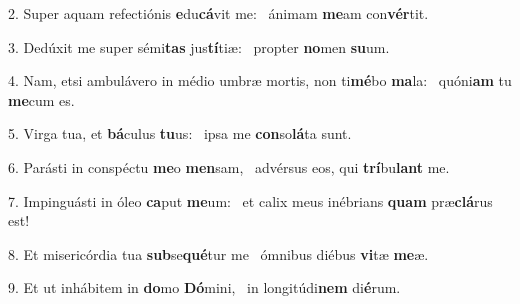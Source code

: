 2. Super aquam refectiónis \textbf{e}du\textbf{cá}vit me: \ast\  ánimam \textbf{me}am con\textbf{vér}tit.\

3. Dedúxit me super sémi\textbf{tas} jus\textbf{tí}tiæ: \ast\  propter \textbf{no}men \textbf{su}um.\

4. Nam, etsi ambulávero in médio umbræ mortis, non ti\textbf{mé}bo \textbf{ma}la: \ast\  quóni\textbf{am} tu \textbf{me}cum es.\

5. Virga tua, et \textbf{bá}culus \textbf{tu}us: \ast\  ipsa me \textbf{con}so\textbf{lá}ta sunt.\

6. Parásti in conspéctu \textbf{me}o \textbf{men}sam, \ast\  advérsus eos, qui \textbf{trí}bu\textbf{lant} me.\

7. Impinguásti in óleo \textbf{ca}put \textbf{me}um: \ast\  et calix meus inébrians \textbf{quam} præ\textbf{clá}rus est!\

8. Et misericórdia tua \textbf{sub}se\textbf{qué}tur me \ast\  ómnibus diébus \textbf{vi}tæ \textbf{me}æ.\

9. Et ut inhábitem in \textbf{do}mo \textbf{Dó}mini, \ast\  in longitúdi\textbf{nem} di\textbf{é}rum.\

